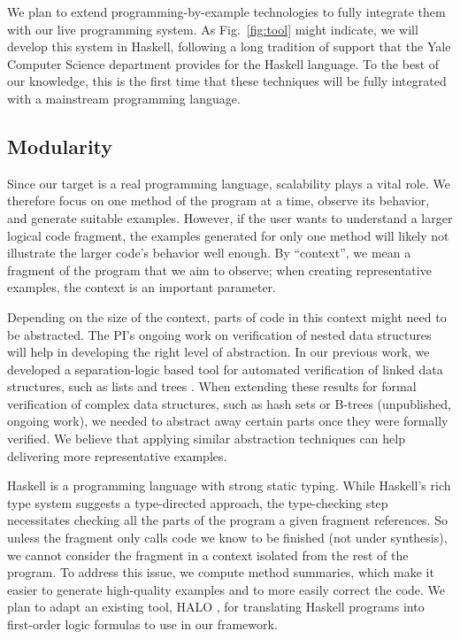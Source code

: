 We plan to extend programming-by-example technologies to fully integrate them with our live programming system. As Fig.~\ref{fig:tool} might indicate, we will develop this system in Haskell, following a long tradition of support that the Yale Computer Science department provides for the Haskell language. To the best of our knowledge, this is the first time that these techniques will be fully integrated with a mainstream programming language.
%

\iffalse

\subsection{Modularity}

Since our target is a real programming language, scalability plays a vital role. We therefore focus on one method of the program at a time, observe its behavior, and generate suitable examples. However, if the user wants to understand a larger logical code fragment, the examples generated for only one method will likely not illustrate the larger code's behavior well enough. By ``context'', we mean a fragment of the program that we aim to observe; when creating representative examples, the context is an important parameter.

Depending on the size of the context, parts of code in this context might need to be abstracted. The PI's ongoing work on verification of nested data structures will help in developing the right level of abstraction. In our previous work, we developed a separation-logic based tool for automated verification of linked data structures, such as lists and trees \cite{PiskacWZ14, tacasPiskacWZ14, PiskacWZ13}. When extending these results for formal verification of complex data structures, such as hash sets or B-trees (unpublished, ongoing work), we needed to abstract away certain parts once they were formally verified. We believe that applying similar abstraction techniques can help delivering more representative examples.

Haskell is a programming language with strong static typing. While Haskell's rich type system suggests a type-directed approach, the type-checking step necessitates checking all the parts of the program a given fragment references. So unless the fragment only calls code we know to be finished (not under synthesis), we cannot consider the fragment in a context isolated from the rest of the program. To address this issue, we compute method summaries, which make it easier to generate high-quality examples and to more easily correct the code. We plan to adapt an existing tool, HALO \cite{VytiniotisJCR13}, for translating Haskell programs into first-order logic formulas to use in our framework.


